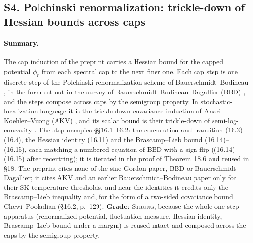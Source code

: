 \documentclass[11pt]{article}
\newcommand{\ploc}[2]{#1}
\newcommand{\sloc}[2]{\cite[#2]{#1}}
\newcommand{\grade}[1]{\textsc{#1}}
\begin{document}
\subsection{S4. Polchinski renormalization: trickle-down of Hessian bounds across caps}\label{f:S4}

\paragraph{Summary.}
The cap induction of the preprint carries a Hessian bound for the capped
potential $\phi_p$ from each spectral cap to the next finer one. Each cap step
is one discrete step of the Polchinski renormalization scheme of
Bauerschmidt--Bodineau \cite{BauerschmidtBodineau2019-SineGordonMultiscaleBakryEmery},
in the form set out in the survey of Bauerschmidt--Bodineau--Dagallier (BBD)
\sloc{BauerschmidtBodineauDagallier2023-PolchinskiIntroduction}{\S\S3.2, 3.4--3.5},
and the steps compose across caps by the semigroup property.
In stochastic-localization language it is the trickle-down covariance
induction of Anari--Koehler--Vuong (AKV)
\sloc{AnariKoehlerVuong2024-TrickleDownLocalizationSchemes}{\S3}, and its
scalar bound is their trickle-down of semi-log-concavity
\sloc{AnariKoehlerVuong2024-TrickleDownLocalizationSchemes}{Thm.~102}.
The step occupies \ploc{\S\S16.1--16.2}{cap-multiscale.tex:143--504}: the
convolution and transition \ploc{(16.3)--(16.4)}{cap-multiscale.tex:154--163},
the Hessian identity \ploc{(16.11)}{cap-multiscale.tex:388--395} and the
Brascamp--Lieb bound \ploc{(16.14)--(16.15)}{cap-multiscale.tex:454--504},
each matching a numbered equation of BBD with a sign flip ((16.14)--(16.15)
after recentring); it is
iterated in the \ploc{proof of Theorem~18.6}{cap-initialization.tex:1006--1012}
and reused in \ploc{\S18}{cap-initialization.tex:479--525}.
The preprint cites none of the sine-Gordon paper, BBD or
Bauerschmidt--Dagallier; it cites AKV and an earlier Bauerschmidt--Bodineau
paper only for their SK temperature thresholds, and near the identities it
credits only the Brascamp--Lieb inequality and, for the form of a two-sided
covariance bound, Chewi--Pooladian
\cite{ChewiPooladian2022-EntropicCaffarelliCovariance}
\ploc{(\S16.2, p.~129)}{cap-multiscale.tex:376--379}.
\textbf{Grade:} \grade{Strong}, because the whole one-step apparatus
(renormalized potential, fluctuation measure, Hessian identity,
Brascamp--Lieb bound under a margin) is reused intact and composed across the
caps by the semigroup property.
\end{document}
